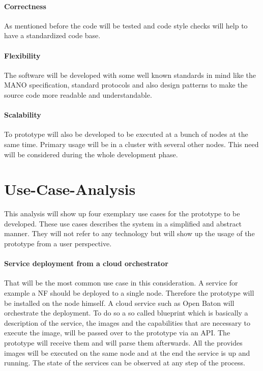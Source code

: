 \paragraph{Correctness} As mentioned before the code will be tested and code style checks will help to have a standardized code base.
\paragraph{Flexibility} The software will be developed with some well known standards in mind like the \ac{MANO} specification, standard protocols and also design patterns to make the source code more readable and understandable.
\paragraph{Scalability} To prototype will also be developed to be executed at a bunch of nodes at the same time.
Primary usage will be in a cluster with several other nodes.
This need will be considered during the whole development phase.


\section{Use-Case-Analysis}
\label{section:use-case-analysis}
This analysis will show up four exemplary use cases for the prototype to be developed.
These use cases describes the system in a simplified and abstract manner.
They will not refer to any technology but will show up the usage of the prototype from a user perspective.

\paragraph{Service deployment from a cloud orchestrator}
That will be the most common use case in this consideration.
A service for example a \ac{NF} should be deployed to a single node.
Therefore the prototype will be installed on the node himself.
A cloud service such as Open Baton will orchestrate the deployment.
To do so a so called blueprint which is basically a description of the service, the images and the capabilities that are necessary to execute the image, will be passed over to the prototype via an \ac{API}.
The prototype will receive them and will parse them afterwards.
All the provides images will be executed on the same node and at the end the service is up and running.
The state of the services can be observed at any step of the process.

